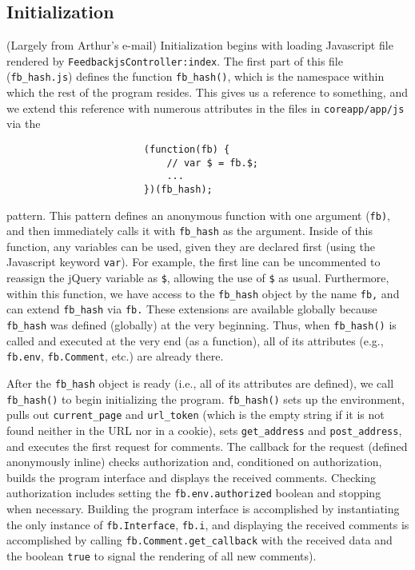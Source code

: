 \documentclass[letterpaper,12pt]{article}
\newcommand{\fb}[1]{\texttt{fb#1}}
\newcommand{\fbhash}[1]{\texttt{fb\_hash#1}}
\newcommand{\code}[1]{{\tt #1}}
\begin{document}
\subsection{Initialization}
\label{sec:init:initialization}
(Largely from Arthur's e-mail)  Initialization begins with loading Javascript file rendered by \code{FeedbackjsController:index}.  The first part of this file (\code{fb\_hash.js}) defines the function \fbhash{()}, which is the namespace within which the rest of the program resides.  This gives us a reference to something, and we extend this reference with numerous attributes in the files in \code{coreapp/app/js} via the 
\begin{lstlisting}
                        (function(fb) {
                        	// var $ = fb.$;
                        	...
                        })(fb_hash);
\end{lstlisting}
\noindent pattern.  This pattern defines an anonymous function with one argument (\fb), and then immediately calls it with \fbhash{} as the argument.  Inside of this function, any variables can be used, given they are declared first (using the Javascript keyword \code{var}).  For example, the first line can be uncommented to reassign the jQuery variable as \code{\$}, allowing the use of \code{\$} as usual.  Furthermore, within this function, we have access to the \fbhash{} object by the name \fb, and can extend \fbhash{} via \fb.  These extensions are available globally because \fbhash{} was defined (globally) at the very beginning.  Thus, when \fbhash{()} is called and executed at the very end (as a function), all of its attributes (e.g., \fb{.env}, \fb{.Comment}, etc.) are already there.

After the \fbhash{} object is ready (i.e., all of its attributes are defined), we call \fbhash{()} to begin initializing the program.  \fbhash{()} sets up the environment, pulls out \code{current\_\-page} and \code{url\_token} (which is the empty string if it is not found neither in the URL nor in a cookie), sets \code{get\_address} and \code{post\_address}, and executes the first request for comments.  The callback for the request (defined anonymously inline) checks authorization and, conditioned on authorization, builds the program interface and displays the received comments.  Checking authorization includes setting the \fb{.env.authorized} boolean and stopping when necessary.  Building the program interface is accomplished by instantiating the only instance of \fb{.Interface}, \fb{.i}, and displaying the received comments is accomplished by calling \fb{.Comment.get\_callback} with the received data and the boolean \code{true} to signal the rendering of all new comments).
\end{document}
